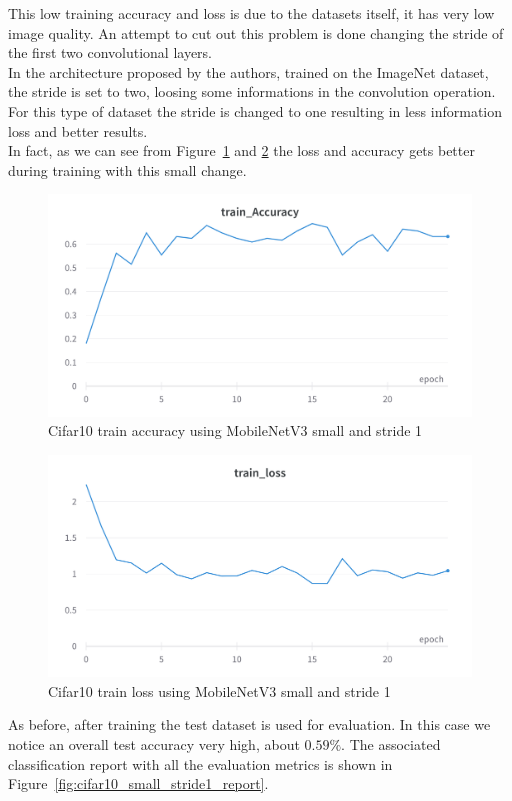 \documentclass[12pt, letterpaper, twoside]{article}
\begin{document}
This low training accuracy and loss is due to the datasets itself, it has very low image quality. An attempt to cut out this problem is done changing the stride of the first two convolutional layers. \\
In the architecture proposed by the authors, trained on the ImageNet dataset, the stride is set to two, loosing some informations in the convolution operation. For this type of dataset the stride is changed to one resulting in less information loss and better results. \\
In fact, as we can see from Figure~\ref{fig:cifar10_small_stride1_acc} and \ref{fig:cifar10_small_stride1_loss} the loss and accuracy gets better during training with this small change.

\begin{figure}[H]
	\centering
	\includegraphics[width=.8\textwidth]{mnet_small_cifar10_accuracy.png}
	\caption{Cifar10 train accuracy using MobileNetV3 small and stride 1}
	\label{fig:cifar10_small_stride1_acc}
\end{figure}

\begin{figure}[H]
	\centering
	\includegraphics[width=.8\textwidth]{mnet_small_cifar10_loss.png}
	\caption{Cifar10 train loss using MobileNetV3 small and stride 1}
	\label{fig:cifar10_small_stride1_loss}
\end{figure}

As before, after training the test dataset is used for evaluation. In this case we notice an overall test accuracy very high, about $0.59\%$. The associated classification report with all the evaluation metrics is shown in Figure~\ref{fig:cifar10_small_stride1_report}.\\
\end{document}
